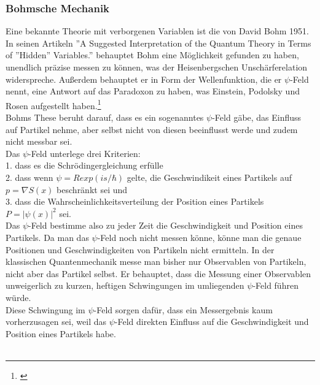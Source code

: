 \subsubsection{Bohmsche Mechanik}
\label{subsubsec:bohmsche_mechanik}
Eine bekannte Theorie mit verborgenen Variablen ist die von David Bohm 1951. In seinen Artikeln ''A Suggested Interpretation of the Quantum Theory in Terms of ''Hidden'' Variables.''  behauptet Bohm eine Möglichkeit gefunden zu haben, unendlich präzise messen zu können, was der Heisenbergschen Unschärferelation widerspreche. Außerdem behauptet er in Form der Wellenfunktion, die er $\psi$-Feld nennt, eine Antwort auf das Paradoxon zu haben, was Einstein, Podolsky und Rosen aufgestellt haben.\footnote{\cite{PhysRev.85.166}}\\
Bohms These beruht darauf, dass es ein sogenanntes $\psi$-Feld gäbe, das Einfluss auf Partikel nehme, aber selbst nicht von diesen beeinflusst werde und zudem nicht messbar sei. \\
Das $\psi$-Feld unterlege drei Kriterien:\\
1. dass es die Schrödingergleichung erfülle\\
2. dass wenn $\psi=R exp(is/\hbar)$ gelte, die Geschwindikeit eines Partikels auf $p=\nabla S(x)$ beschränkt sei und \\
3. dass die Wahrscheinlichkeitsverteilung der Position eines Partikels $P=|\psi(x)|^2$ sei. \\
Das $\psi$-Feld bestimme also zu jeder Zeit die Geschwindigkeit und Position eines Partikels. Da man das $\psi$-Feld noch nicht messen könne, könne man die genaue Positionen und Geschwindigkeiten von Partikeln nicht ermitteln.
In der klassischen Quantenmechanik messe man bisher nur Observablen von Partikeln, nicht aber das Partikel selbst. Er behauptet, dass die Messung einer Observablen unweigerlich zu kurzen, heftigen Schwingungen im umliegenden $\psi$-Feld führen würde.\\
Diese Schwingung im $\psi$-Feld sorgen dafür, dass ein Messergebnis kaum vorherzusagen sei, weil das $\psi$-Feld direkten Einfluss auf die Geschwindigkeit und Position eines Partikels habe. \\\\
